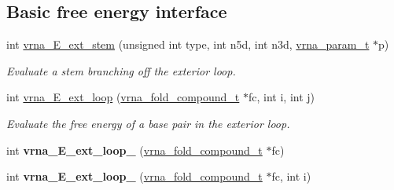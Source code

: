 \subsection*{Basic free energy interface}
\begin{DoxyCompactItemize}
\item 
int \hyperlink{group__eval__loops__ext_gaa0c313c90da11aa741dcd62746d85337}{vrna\+\_\+\+E\+\_\+ext\+\_\+stem} (unsigned int type, int n5d, int n3d, \hyperlink{group__energy__parameters_ga8a69ca7d787e4fd6079914f5343a1f35}{vrna\+\_\+param\+\_\+t} $\ast$p)
\begin{DoxyCompactList}\small\item\em Evaluate a stem branching off the exterior loop. \end{DoxyCompactList}\item 
int \hyperlink{group__eval__loops__ext_gace51f32d5b34b7003b51c948afc6c207}{vrna\+\_\+\+E\+\_\+ext\+\_\+loop} (\hyperlink{group__fold__compound_ga1b0cef17fd40466cef5968eaeeff6166}{vrna\+\_\+fold\+\_\+compound\+\_\+t} $\ast$fc, int i, int j)
\begin{DoxyCompactList}\small\item\em Evaluate the free energy of a base pair in the exterior loop. \end{DoxyCompactList}\item 
\mbox{\label{group__eval__loops__ext_gad26689b27fcaab5a1dcbd0d37d27ad5f}} 
int {\bfseries vrna\+\_\+\+E\+\_\+ext\+\_\+loop\+\_} (\hyperlink{group__fold__compound_ga1b0cef17fd40466cef5968eaeeff6166}{vrna\+\_\+fold\+\_\+compound\+\_\+t} $\ast$fc)
\item 
\mbox{\label{group__eval__loops__ext_ga6e57363a8ff3597cc69181c33fbb8196}} 
int {\bfseries vrna\+\_\+\+E\+\_\+ext\+\_\+loop\+\_} (\hyperlink{group__fold__compound_ga1b0cef17fd40466cef5968eaeeff6166}{vrna\+\_\+fold\+\_\+compound\+\_\+t} $\ast$fc, int i)
\end{DoxyCompactItemize}
